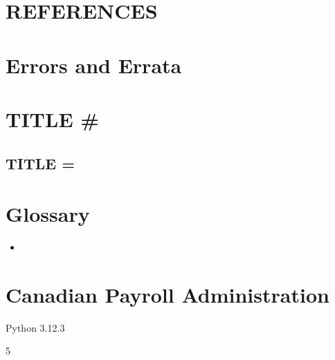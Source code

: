 \documentclass[letterpaper,10pt,english]{sphinxmanual}
\begin{document}
\sphinxAtStartPar
{}

\sphinxstepscope


\chapter{REFERENCES}
\label{\detokenize{references:references}}\label{\detokenize{references::doc}}
\sphinxAtStartPar
{}

\sphinxstepscope


\chapter{Errors and Errata}
\label{\detokenize{errata:errors-and-errata}}\label{\detokenize{errata::doc}}
\sphinxstepscope


\chapter{TITLE \#}
\label{\detokenize{syntax:title}}\label{\detokenize{syntax::doc}}

\section{TITLE =}
\label{\detokenize{syntax:id1}}

\chapter{Glossary}
\label{\detokenize{index:glossary}}\begin{itemize}
\item {} 
\sphinxAtStartPar
{}

\end{itemize}


\chapter{Canadian Payroll Administration}
\label{\detokenize{index:canadian-payroll-administration}}
\begin{sphinxVerbatim}[commandchars=\\\{\}]
Python 3.12.3
\end{sphinxVerbatim}

\begin{sphinxVerbatim}[commandchars=\\\{\}]
5
\end{sphinxVerbatim}



\renewcommand{\indexname}{Index}
\printindex
\end{document}
